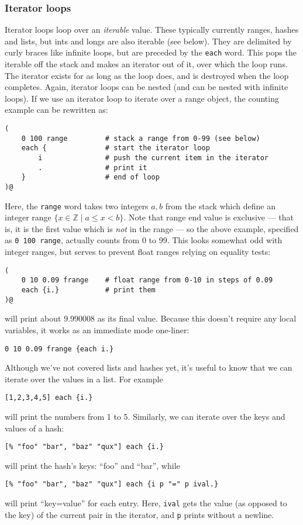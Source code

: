 \subsubsection{Iterator loops}
Iterator loops loop over an \emph{iterable} value. These typically currently ranges,
hashes and lists, but ints and longs are also iterable (see below). They are delimited by curly braces like infinite loops,
but are preceded by the 
\texttt{each} word. This pops the iterable off the stack and makes an
iterator out of it, over which the loop runs. The iterator exists for as 
long as the loop does, and is destroyed when the loop completes. Again, iterator
loops can be nested (and can be nested with infinite loops). If we use
an iterator loop to iterate over a range object,
the counting example can be rewritten as:
\begin{lstlisting}
(
    0 100 range         # stack a range from 0-99 (see below)
    each {              # start the iterator loop
        i               # push the current item in the iterator
        .               # print it
    }                   # end of loop
)@
\end{lstlisting}
Here, the \texttt{range} word takes two integers $a,b$ from the stack which define
an integer range $\{x\in \mathbb{Z} \mid a \le x < b\}$.
Note that range end value is exclusive --- that is, it is the first value which
is \emph{not} in the range --- so the above example, specified as
\texttt{0 100 range}, actually counts from 0 to 99. 
This looks somewhat odd with integer ranges, but serves to prevent float ranges
relying on equality tests:
\begin{lstlisting}
(
    0 10 0.09 frange    # float range from 0-10 in steps of 0.09
    each {i.}           # print them
)@
\end{lstlisting}
will print about 9.990008 as its final value. Because this doesn't require
any local variables, it works as an immediate mode one-liner:
\begin{lstlisting}
0 10 0.09 frange {each i.}
\end{lstlisting}

Although we've not covered lists and hashes yet, it's useful to know that we can
iterate over the values in a list. For example
\begin{lstlisting}
[1,2,3,4,5] each {i.}
\end{lstlisting}
will print the numbers from 1 to 5. Similarly, we can iterate over the keys 
and values of a hash:
\begin{lstlisting}
[% "foo" "bar", "baz" "qux"] each {i.}
\end{lstlisting}
will print the hash's keys: ``foo'' and ``bar'', while
\begin{lstlisting}
[% "foo" "bar", "baz" "qux"] each {i p "=" p ival.}
\end{lstlisting}
will print ``key=value'' for each entry. Here, \texttt{ival} gets the value
(as opposed to the key)
of the current pair in the iterator, 
and \texttt{p} prints without a newline.


